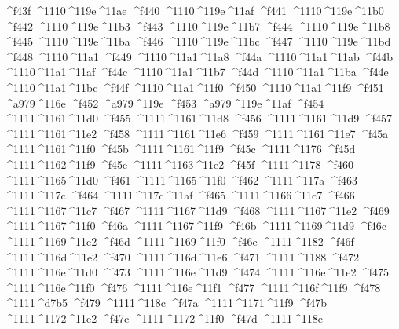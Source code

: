 \checkit ^^^^f43f ^^^^1110^^^^119e^^^^11ae
\checkit ^^^^f440 ^^^^1110^^^^119e^^^^11af
\checkit ^^^^f441 ^^^^1110^^^^119e^^^^11b0
\checkit ^^^^f442 ^^^^1110^^^^119e^^^^11b3
\checkit ^^^^f443 ^^^^1110^^^^119e^^^^11b7
\checkit ^^^^f444 ^^^^1110^^^^119e^^^^11b8
\checkit ^^^^f445 ^^^^1110^^^^119e^^^^11ba
\checkit ^^^^f446 ^^^^1110^^^^119e^^^^11bc
\checkit ^^^^f447 ^^^^1110^^^^119e^^^^11bd
\checkit ^^^^f448 ^^^^1110^^^^11a1
\checkit ^^^^f449 ^^^^1110^^^^11a1^^^^11a8
\checkit ^^^^f44a ^^^^1110^^^^11a1^^^^11ab
\checkit ^^^^f44b ^^^^1110^^^^11a1^^^^11af
\checkit ^^^^f44c ^^^^1110^^^^11a1^^^^11b7
\checkit ^^^^f44d ^^^^1110^^^^11a1^^^^11ba
\checkit ^^^^f44e ^^^^1110^^^^11a1^^^^11bc
\checkit ^^^^f44f ^^^^1110^^^^11a1^^^^11f0
\checkit ^^^^f450 ^^^^1110^^^^11a1^^^^11f9
\checkit ^^^^f451 ^^^^a979^^^^116e
\checkit ^^^^f452 ^^^^a979^^^^119e
\checkit ^^^^f453 ^^^^a979^^^^119e^^^^11af
\checkit ^^^^f454 ^^^^1111^^^^1161^^^^11d0
\checkit ^^^^f455 ^^^^1111^^^^1161^^^^11d8
\checkit ^^^^f456 ^^^^1111^^^^1161^^^^11d9
\checkit ^^^^f457 ^^^^1111^^^^1161^^^^11e2
\checkit ^^^^f458 ^^^^1111^^^^1161^^^^11e6
\checkit ^^^^f459 ^^^^1111^^^^1161^^^^11e7
\checkit ^^^^f45a ^^^^1111^^^^1161^^^^11f0
\checkit ^^^^f45b ^^^^1111^^^^1161^^^^11f9
\checkit ^^^^f45c ^^^^1111^^^^1176
\checkit ^^^^f45d ^^^^1111^^^^1162^^^^11f9
\checkit ^^^^f45e ^^^^1111^^^^1163^^^^11e2
\checkit ^^^^f45f ^^^^1111^^^^1178
\checkit ^^^^f460 ^^^^1111^^^^1165^^^^11d0
\checkit ^^^^f461 ^^^^1111^^^^1165^^^^11f0
\checkit ^^^^f462 ^^^^1111^^^^117a
\checkit ^^^^f463 ^^^^1111^^^^117c
\checkit ^^^^f464 ^^^^1111^^^^117c^^^^11af
\checkit ^^^^f465 ^^^^1111^^^^1166^^^^11c7
\checkit ^^^^f466 ^^^^1111^^^^1167^^^^11c7
\checkit ^^^^f467 ^^^^1111^^^^1167^^^^11d9
\checkit ^^^^f468 ^^^^1111^^^^1167^^^^11e2
\checkit ^^^^f469 ^^^^1111^^^^1167^^^^11f0
\checkit ^^^^f46a ^^^^1111^^^^1167^^^^11f9
\checkit ^^^^f46b ^^^^1111^^^^1169^^^^11d9
\checkit ^^^^f46c ^^^^1111^^^^1169^^^^11e2
\checkit ^^^^f46d ^^^^1111^^^^1169^^^^11f0
\checkit ^^^^f46e ^^^^1111^^^^1182
\checkit ^^^^f46f ^^^^1111^^^^116d^^^^11e2
\checkit ^^^^f470 ^^^^1111^^^^116d^^^^11e6
\checkit ^^^^f471 ^^^^1111^^^^1188
\checkit ^^^^f472 ^^^^1111^^^^116e^^^^11d0
\checkit ^^^^f473 ^^^^1111^^^^116e^^^^11d9
\checkit ^^^^f474 ^^^^1111^^^^116e^^^^11e2
\checkit ^^^^f475 ^^^^1111^^^^116e^^^^11f0
\checkit ^^^^f476 ^^^^1111^^^^116e^^^^11f1
\checkit ^^^^f477 ^^^^1111^^^^116f^^^^11f9
\checkit ^^^^f478 ^^^^1111^^^^d7b5
\checkit ^^^^f479 ^^^^1111^^^^118c
\checkit ^^^^f47a ^^^^1111^^^^1171^^^^11f9
\checkit ^^^^f47b ^^^^1111^^^^1172^^^^11e2
\checkit ^^^^f47c ^^^^1111^^^^1172^^^^11f0
\checkit ^^^^f47d ^^^^1111^^^^118e
